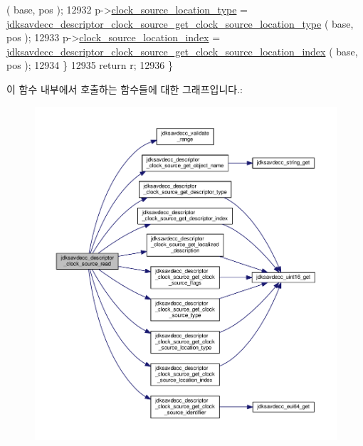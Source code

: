 \begin{DoxyCode}
      ( base, pos );
12932         p->\hyperlink{structjdksavdecc__descriptor__clock__source_aa1b89e381447b34cdb73d97f8e11405b}{clock\_source\_location\_type} = 
      \hyperlink{group__descriptor__clock__source_ga12d8acff7f2bb5f81d13e5c09dca830f}{jdksavdecc\_descriptor\_clock\_source\_get\_clock\_source\_location\_type}
      ( base, pos );
12933         p->\hyperlink{structjdksavdecc__descriptor__clock__source_a598dddbb71e2f7dd57835ed93efdc02d}{clock\_source\_location\_index} = 
      \hyperlink{group__descriptor__clock__source_gadf8261c84c76e70e1a884391e17b1f5b}{jdksavdecc\_descriptor\_clock\_source\_get\_clock\_source\_location\_index}
      ( base, pos );
12934     \}
12935     \textcolor{keywordflow}{return} r;
12936 \}
\end{DoxyCode}


이 함수 내부에서 호출하는 함수들에 대한 그래프입니다.\+:
\nopagebreak
\begin{figure}[H]
\begin{center}
\leavevmode
\includegraphics[width=350pt]{group__descriptor__clock__source_ga725ff5fcf4ab61a873008095e810e1f0_cgraph}
\end{center}
\end{figure}


